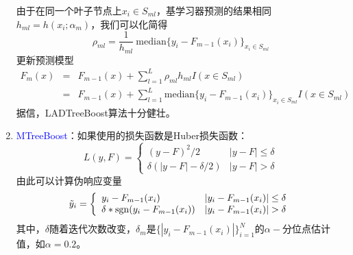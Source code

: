 \begin{enumerate}[（1）]
    由于在同一个叶子节点上$x_i\in S_{ml}$，基学习器预测的结果相同$h_{ml}=h(x_i;\alpha_m)$，我们可以化简得
    \begin{equation}
        \rho_{ml} = \frac{1}{h_{ml}}~\text{median} \{y_i - F_{m-1}(x_i)\}_{x_i\in S_{ml}}
    \end{equation}
    更新预测模型
    \begin{equation}
        \begin{array}{lll}
          F_m(x) & = & F_{m-1}(x) + \sum\limits_{l=1}^L  \rho_{ml} h_{ml} I(x\in S_{ml}) \\
          & = & F_{m-1}(x) + \sum\limits_{l=1}^L  \text{median} \{y_i - F_{m-1}(x_i)\}_{x_i\in S_{ml}} I(x\in S_{ml})
        \end{array}
    \end{equation}
    据信，LADTreeBoost算法十分健壮。
  \item \textcolor{blue}{MTreeBoost}：如果使用的损失函数是Huber损失函数：
    \begin{equation}
        L(y,F) = \left\{
        \begin{array}{ll}
          (y-F)^2/2 & |y-F|\le \delta \\
          \delta(|y-F|-\delta/2) & |y-F|> \delta
        \end{array}
        \right.
    \end{equation}
    由此可以计算伪响应变量
    \begin{equation}
        \tilde{y}_i = \left\{
        \begin{array}{ll}
          y_i-F_{m-1}(x_i) & |y_i-F_{m-1}(x_i)|\le \delta \\
          \delta *\sgn(y_i-F_{m-1}(x_i)) & |y_i-F_{m-1}(x_i)|> \delta
        \end{array}
        \right.
    \end{equation}
    其中，$\delta$随着迭代次数改变，$\delta_m$是$\{|y_i-F_{m-1}(x_i)|\}_{i=1}^N$的$\alpha-$分位点估计值，如$\alpha=0.2$。


\end{enumerate}
